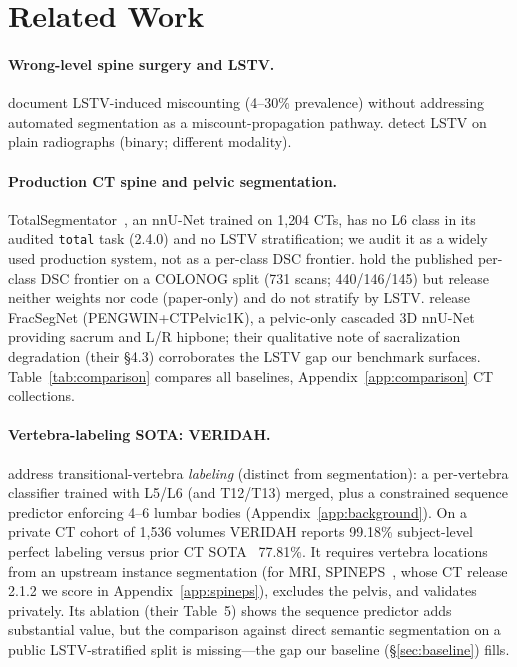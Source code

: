 \documentclass{article}
\newcommand{\TS}{TotalSegmentator}
\newcommand{\VERIDAH}{VERIDAH}
\begin{document}
\section{Related Work}
\label{sec:related}

\paragraph{Wrong-level spine surgery and LSTV.}
\citep{Konin2010LumbosacralRelevance,Carrino2011EffectImaging,Sekharappa2014LumbosacralSignificance}
document LSTV-induced miscounting (4--30\% prevalence) without
addressing automated segmentation as a miscount-propagation
pathway. \citet{Kwak2025AutomatedModel} detect LSTV on plain
radiographs (binary; different modality).

\paragraph{Production CT spine and pelvic segmentation.}
\TS{}~\citep{Wasserthal2023TotalSegmentator:Images}, an nnU-Net
trained on 1{,}204 CTs, has no L6 class in its audited
\texttt{total} task (2.4.0) and no LSTV stratification; we audit it as
a widely used production system, not as a per-class DSC
frontier.
\citet{Li2025LumbarMechanism} hold the published per-class
DSC frontier on a COLONOG split (731 scans; 440/146/145)
but release neither weights nor code (paper-only) and do
not stratify by LSTV. \citet{Liu2025AutomaticDataset}
release FracSegNet (PENGWIN+CTPelvic1K), a pelvic-only
cascaded 3D nnU-Net providing sacrum and L/R hipbone; their
qualitative note of sacralization degradation (their
\S4.3) corroborates the LSTV gap our benchmark surfaces.
Table~\ref{tab:comparison} compares all baselines,
Appendix~\ref{app:comparison} CT collections.

\paragraph{Vertebra-labeling SOTA: \VERIDAH{}.}
\citet{Moller2026VERIDAH:Sequences} address transitional-vertebra
\emph{labeling} (distinct from segmentation): a per-vertebra
classifier trained with L5/L6 (and T12/T13) merged, plus a
constrained sequence predictor enforcing 4--6 lumbar bodies
(Appendix~\ref{app:background}). On a private CT cohort of 1{,}536
volumes \VERIDAH{} reports 99.18\% subject-level perfect
labeling versus prior CT SOTA~\citep{Meng2022VertebraeMLMI}
77.81\%. It requires vertebra locations from an upstream
instance segmentation (for MRI,
SPINEPS~\citep{Moller2024SPINEPSautomaticSegmentation}, whose
CT release 2.1.2 we score in Appendix~\ref{app:spineps}),
excludes the pelvis, and validates privately. Its ablation
(their Table~5) shows the sequence predictor adds substantial
value, but the comparison against direct semantic
segmentation on a public LSTV-stratified split is
missing---the gap our baseline (\S\ref{sec:baseline}) fills.
\end{document}

